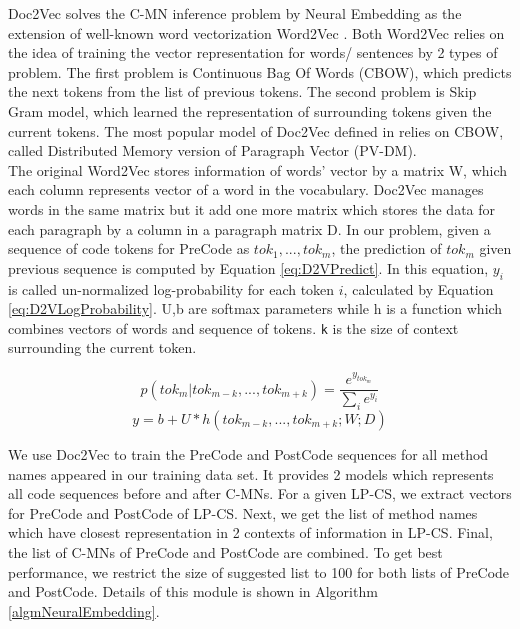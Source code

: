 \documentclass[sigconf,review,anonymous]{article}
\begin{document}
Doc2Vec solves the C-MN inference problem by Neural Embedding as the extension of well-known word vectorization Word2Vec \cite{014}. Both Word2Vec relies on the idea of training the vector representation for words/ sentences by 2 types of problem. The first problem is Continuous Bag Of Words (CBOW), which predicts the next tokens from the list of previous tokens. The second problem is Skip Gram model, which learned the representation of surrounding tokens given the current tokens. The most popular model of Doc2Vec defined in \cite{002} relies on CBOW, called Distributed Memory version of Paragraph Vector (PV-DM).
\\
The original Word2Vec stores information of words' vector by a matrix W, which each column represents vector of a word in the vocabulary. Doc2Vec manages words in the same matrix but it add one more matrix which stores the data for each paragraph by a column in a paragraph matrix D. In our problem, given a sequence of code tokens for PreCode as $tok_{1},...,tok_{m}$, the prediction of $tok_{m}$ given previous sequence is computed by Equation \ref{eq:D2VPredict}. In this equation, $y_{i}$ is called un-normalized log-probability for each token $i$, calculated by Equation \ref{eq:D2VLogProbability}. U,b are softmax parameters while h is a function which combines vectors of words and sequence of tokens. \texttt{k} is the size of context surrounding the current token.

\begin{equation} 
\label{eq:D2VPredict}
 p(tok_{m}|tok_{m-k},...,tok_{m+k})=\frac{e^{y_{tok_{m}}}}{\sum _{i} e^{y_{i}}}
\end{equation}
\begin{equation} 
\label{eq:D2VLogProbability}
 y=b+U*h(tok_{m-k},...,tok_{m+k};W;D)
\end{equation}



We use Doc2Vec to train the PreCode and PostCode sequences for all method names appeared in our training data set. It provides 2 models which represents all code sequences before and after C-MNs. For a given LP-CS, we extract vectors for PreCode and PostCode of LP-CS. Next, we get the list of method names which have closest representation in 2 contexts of information in LP-CS. Final, the list of C-MNs of PreCode and PostCode are combined. To get best performance, we restrict the size of suggested list to 100 for both lists of PreCode and PostCode. Details of this module is shown in Algorithm \ref{algmNeuralEmbedding}.
\end{document}
